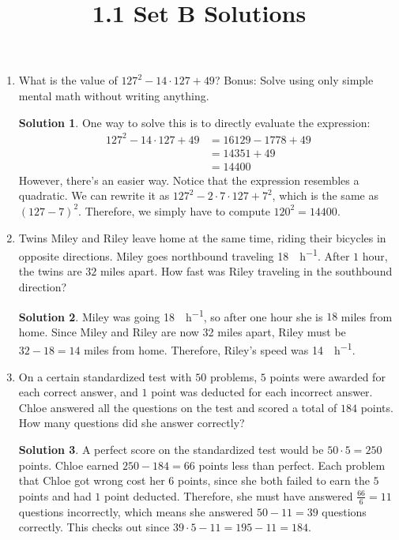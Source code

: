 \documentclass{article}
\title{1.1 Set B Solutions}
\author{}
\date{}
\theoremstyle{definition}
\newtheorem*{solution}{Solution}
\begin{document}
    \maketitle
    \begin{enumerate}
        \item What is the value of $127^2 - 14 \cdot 127 + 49$? Bonus: Solve
        using only simple mental math without writing anything.
        \begin{solution}
            One way to solve this is to directly evaluate the expression:
            \[\begin{split} 127^2 - 14 \cdot 127 + 49 & = 16129 - 1778 + 49 \\
                & = 14351 + 49 \\
                & = 14400 \end{split}\] However, there's an easier way. Notice
            that the expression resembles a quadratic. We can rewrite it as
            $127^2 - 2 \cdot 7 \cdot 127 + 7^2$, which is the same as $(127 -
            7)^2$. Therefore, we simply have to compute $120^2 = 14400$.
        \end{solution}
        \item Twins Miley and Riley leave home at the same time, riding their
        bicycles in opposite directions. Miley goes northbound traveling
        \SI{18}{\mile\per\hour}. After $1$ hour, the twins are $32$ miles apart.
        How fast was Riley traveling in the southbound direction?
        \begin{solution}
            Miley was going \SI{18}{\mile\per\hour}, so after one hour she is
            $18$ miles from home. Since Miley and Riley are now 32 miles apart,
            Riley must be $32 - 18 = 14$ miles from home. Therefore, Riley's
            speed was \SI{14}{\mile\per\hour}.
        \end{solution}
        \item On a certain standardized test with $50$ problems, $5$ points were
        awarded for each correct answer, and $1$ point was deducted for each
        incorrect answer. Chloe answered all the questions on the test and
        scored a total of $184$ points. How many questions did she answer
        correctly?
        \begin{solution}
            A perfect score on the standardized test would be $50 \cdot 5 = 250$
            points. Chloe earned $250 - 184 = 66$ points less than perfect. Each
            problem that Chloe got wrong cost her $6$ points, since she both
            failed to earn the $5$ points and had $1$ point deducted. Therefore,
            she must have answered $\frac{66}{6} = 11$ questions incorrectly,
            which means she answered $50 - 11 = 39$ questions correctly. This
            checks out since $39 \cdot 5 - 11 = 195 - 11 = 184$.


\end{solution}
\end{enumerate}
\end{document}
